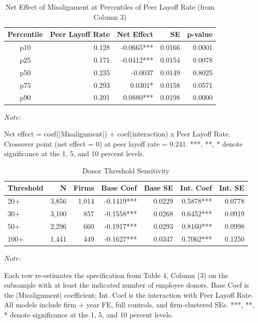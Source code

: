 \documentclass[
  10pt,
]{article}
\begin{document}
\begin{table}[!h]
\centering
\caption{\label{tab:table4-net}Net Effect of Misalignment at Percentiles of Peer Layoff Rate (from Column 3)}
\centering
\fontsize{9}{11}\selectfont
\begin{threeparttable}
\begin{tabular}[t]{crrrr}
\toprule
Percentile & Peer Layoff Rate & Net Effect & SE & p-value\\
\midrule
p10 & 0.128 & -0.0665*** & 0.0166 & 0.0001\\
p25 & 0.171 & -0.0412*** & 0.0154 & 0.0078\\
p50 & 0.235 & -0.0037 & 0.0149 & 0.8025\\
p75 & 0.293 & 0.0301* & 0.0158 & 0.0571\\
p90 & 0.391 & 0.0880*** & 0.0198 & 0.0000\\
\bottomrule
\end{tabular}
\begin{tablenotes}[para]
\item \textit{Note: } 
\item Net effect = coef(|Misalignment|) + coef(interaction) x Peer Layoff Rate. Crossover point (net effect = 0) at peer layoff rate = 0.241. ***, **, * denote significance at the 1, 5, and 10 percent levels.
\end{tablenotes}
\end{threeparttable}
\end{table}

\newpage

\begin{table}[!h]
\centering
\caption{\label{tab:table5}Donor Threshold Sensitivity}
\centering
\fontsize{9}{11}\selectfont
\begin{threeparttable}
\begin{tabular}[t]{lrrrrrr}
\toprule
Threshold & N & Firms & Base Coef & Base SE & Int. Coef & Int. SE\\
\midrule
20+ & 3,856 & 1,014 & -0.1419*** & 0.0229 & 0.5878*** & 0.0778\\
30+ & 3,100 & 857 & -0.1558*** & 0.0268 & 0.6452*** & 0.0919\\
50+ & 2,296 & 660 & -0.1917*** & 0.0293 & 0.8160*** & 0.0998\\
100+ & 1,441 & 449 & -0.1627*** & 0.0347 & 0.7062*** & 0.1250\\
\bottomrule
\end{tabular}
\begin{tablenotes}[para]
\item \textit{Note: } 
\item Each row re-estimates the specification from Table 4, Column (3) on the subsample with at least the indicated number of employee donors. Base Coef is the |Misalignment| coefficient; Int. Coef is the interaction with Peer Layoff Rate. All models include firm + year FE, full controls, and firm-clustered SEs. ***, **, * denote significance at the 1, 5, and 10 percent levels.
\end{tablenotes}
\end{threeparttable}
\end{table}
\end{document}
